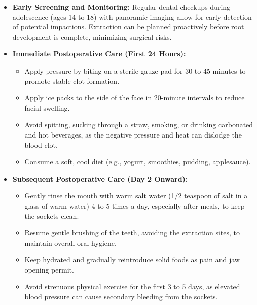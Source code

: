 \begin{itemize}
    \item \textbf{Early Screening and Monitoring:} Regular dental checkups during adolescence (ages 14 to 18) with panoramic imaging allow for early detection of potential impactions. Extraction can be planned proactively before root development is complete, minimizing surgical risks.
    \item \textbf{Immediate Postoperative Care (First 24 Hours):}
    \begin{itemize}
        \item Apply pressure by biting on a sterile gauze pad for 30 to 45 minutes to promote stable clot formation.
        \item Apply ice packs to the side of the face in 20-minute intervals to reduce facial swelling.
        \item Avoid spitting, sucking through a straw, smoking, or drinking carbonated and hot beverages, as the negative pressure and heat can dislodge the blood clot.
        \item Consume a soft, cool diet (e.g., yogurt, smoothies, pudding, applesauce).
    \end{itemize}
    \item \textbf{Subsequent Postoperative Care (Day 2 Onward):}
    \begin{itemize}
        \item Gently rinse the mouth with warm salt water (1/2 teaspoon of salt in a glass of warm water) 4 to 5 times a day, especially after meals, to keep the sockets clean.
        \item Resume gentle brushing of the teeth, avoiding the extraction sites, to maintain overall oral hygiene.
        \item Keep hydrated and gradually reintroduce solid foods as pain and jaw opening permit.
        \item Avoid strenuous physical exercise for the first 3 to 5 days, as elevated blood pressure can cause secondary bleeding from the sockets.
    \end{itemize}
\end{itemize}

